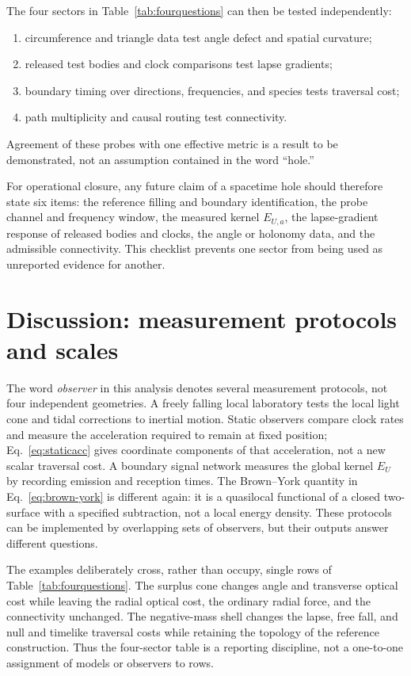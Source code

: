 \documentclass[aps,prd,twocolumn,amsmath,amssymb,nofootinbib]{revtex4-2}
\begin{document}
The four sectors in Table~\ref{tab:fourquestions} can then be tested
independently:
\begin{enumerate}
 \item circumference and triangle data test angle defect and spatial curvature;
 \item released test bodies and clock comparisons test lapse gradients;
 \item boundary timing over directions, frequencies, and species tests
       traversal cost;
 \item path multiplicity and causal routing test connectivity.
\end{enumerate}
Agreement of these probes with one effective metric is a result to be
demonstrated, not an assumption contained in the word ``hole.''

For operational closure, any future claim of a spacetime hole should therefore
state six items: the reference filling and boundary identification, the probe
channel and frequency window, the measured kernel $E_{U,a}$, the lapse-gradient
response of released bodies and clocks, the angle or holonomy data, and the
admissible connectivity.  This checklist prevents one sector from being used
as unreported evidence for another.

\section{Discussion: measurement protocols and scales}
\label{sec:discussion}

The word \emph{observer} in this analysis denotes several measurement
protocols, not four independent geometries.  A freely falling local laboratory
tests the local light cone and tidal corrections to inertial motion.  Static
observers compare clock rates and measure the acceleration required to remain
at fixed position; Eq.~\eqref{eq:staticacc} gives coordinate components of that
acceleration, not a new scalar traversal cost.  A boundary signal network
measures the global kernel $E_U$ by recording emission and reception times.
The Brown--York quantity in Eq.~\eqref{eq:brown-york} is different again: it is
a quasilocal functional of a closed two-surface with a specified subtraction,
not a local energy density.  These protocols can be implemented by overlapping
sets of observers, but their outputs answer different questions.

The examples deliberately cross, rather than occupy, single rows of
Table~\ref{tab:fourquestions}.  The surplus cone changes angle and transverse
optical cost while leaving the radial optical cost, the ordinary radial force,
and the connectivity unchanged.  The negative-mass shell changes the lapse,
free fall, and null and timelike traversal costs while retaining the topology
of the reference construction.  Thus the four-sector table is a reporting
discipline, not a one-to-one assignment of models or observers to rows.
\end{document}
